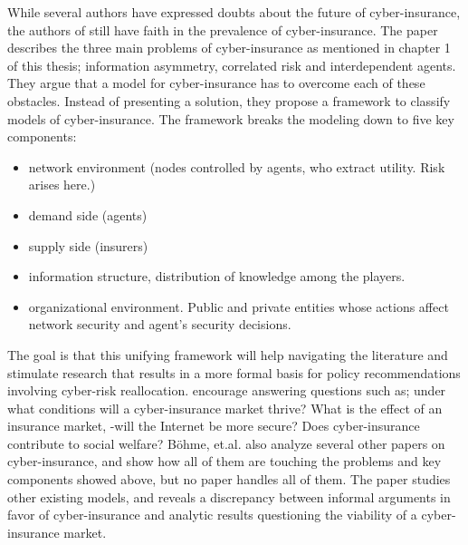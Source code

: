 
While several authors have expressed doubts about the future of cyber-insurance, the authors of \cite{bohme2010modeling} still have faith in the prevalence of cyber-insurance. The paper describes the three main problems of cyber-insurance as mentioned in chapter 1 of this thesis; information asymmetry, correlated risk and interdependent agents. They argue that a model for cyber-insurance has to overcome each of these obstacles. Instead of presenting a solution, they propose a framework to classify models of cyber-insurance. 
The framework breaks the modeling down to five key components: 
\begin{itemize}[topsep=-1em,parsep=0em,itemsep=0em] 
 \item network environment (nodes controlled by agents, who extract utility. Risk arises here.)
 \item demand side (agents) 
 \item supply side (insurers) 
 \item information structure, distribution of knowledge among the players. 
 \item organizational environment. Public and private entities whose actions affect network security and agent's security decisions.
 
\end{itemize}


The goal is that this unifying framework will help navigating the literature and stimulate research that results in a more formal basis for policy recommendations involving cyber-risk reallocation. \cite{bohme2010modeling} encourage answering questions such as; under what conditions will a cyber-insurance market thrive? What is the effect of an insurance market, -will the Internet be more secure? Does cyber-insurance contribute to social welfare?
Böhme, et.al. also analyze several other papers on cyber-insurance, and show how all of them are touching the problems and key components showed above, but no paper handles all of them.
The paper studies other existing models, and reveals a discrepancy between informal arguments in favor of cyber-insurance and analytic results questioning the viability of a cyber-insurance market. 

